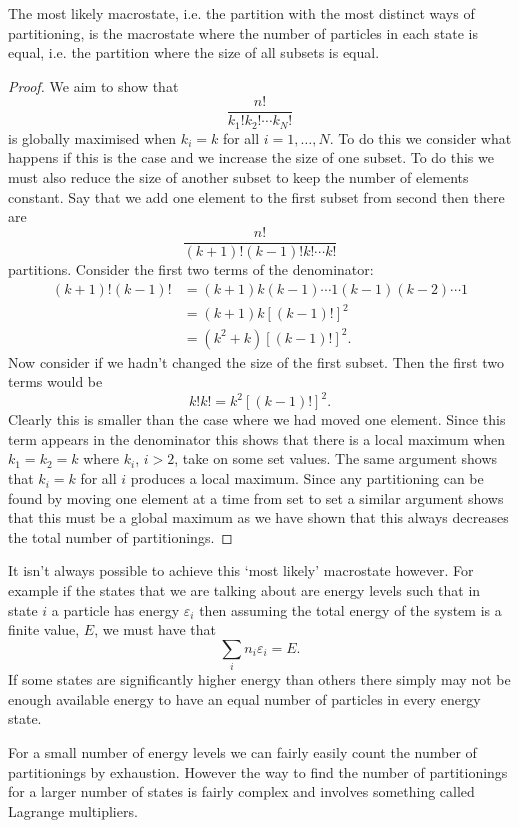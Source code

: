     \begin{theorem}
        The most likely macrostate, i.e. the partition with the most distinct ways of partitioning, is the macrostate where the number of particles in each state is equal, i.e. the partition where the size of all subsets is equal.
    \end{theorem}
    \begin{proof}
        We aim to show that
        \[\frac{n!}{k_1!k_2!\dotsm k_N!}\]
        is globally maximised when \(k_i = k\) for all \(i = 1, \dotsc, N\).
        To do this we consider what happens if this is the case and we increase the size of one subset.
        To do this we must also reduce the size of another subset to keep the number of elements constant.
        Say that we add one element to the first subset from second then there are
        \[\frac{n!}{(k + 1)!(k - 1)!k!\dotsm k!}\]
        partitions.
        Consider the first two terms of the denominator:
        \begin{align*}
            (k + 1)!(k - 1)! &= (k + 1)k(k - 1) \dotsm 1(k - 1)(k - 2)\dotsm 1\\
            &= (k + 1)k[(k - 1)!]^2\\
            &= (k^2 + k)[(k - 1)!]^2.
        \end{align*}
        Now consider if we hadn't changed the size of the first subset.
        Then the first two terms would be
        \[k!k! = k^2[(k-1)!]^2.\]
        Clearly this is smaller than the case where we had moved one element.
        Since this term appears in the denominator this shows that there is a local maximum when \(k_1 = k_2 = k\) where \(k_i\), \(i > 2\), take on some set values.
        The same argument shows that \(k_i = k\) for all \(i\) produces a local maximum.
        Since any partitioning can be found by moving one element at a time from set to set a similar argument shows that this must be a global maximum as we have shown that this always decreases the total number of partitionings.
    \end{proof}
    It isn't always possible to achieve this `most likely' macrostate however.
    For example if the states that we are talking about are energy levels such that in state \(i\) a particle has energy \(\varepsilon_i\) then assuming the total energy of the system is a finite value, \(E\), we must have that
    \[\sum_{i} n_i\varepsilon_i = E.\]
    If some states are significantly higher energy than others there simply may not be enough available energy to have an equal number of particles in every energy state.
    
    For a small number of energy levels we can fairly easily count the number of partitionings by exhaustion.
    However the way to find the number of partitionings for a larger number of states is fairly complex and involves something called Lagrange multipliers.